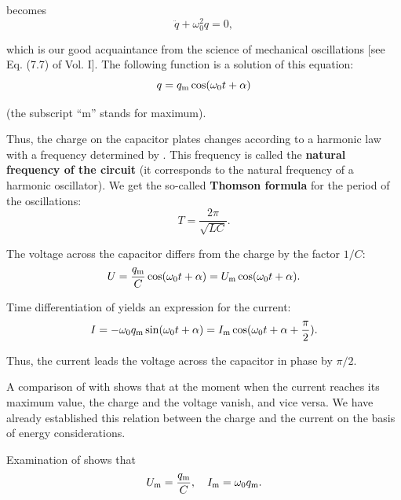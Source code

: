 \noindent
{} becomes
\begin{equation}\label{eq:13_4}
    \ddot{q} + \omega_0^2 q = 0,
\end{equation}

\noindent
which is our good acquaintance from the science of mechanical oscillations [see Eq. (7.7) of Vol. I].
The following function is a solution of this equation:
\begin{equation}\label{eq:13_5}
    q = q_{\text{m}} \cos(\omega_0 t + \alpha)
\end{equation}

\noindent
(the subscript ``m'' stands for maximum).

Thus, the charge on the capacitor plates changes according to a harmonic law with a frequency determined by .
This frequency is called the \textbf{natural frequency of the circuit} (it corresponds to the natural frequency of a harmonic oscillator).
We get the so-called \textbf{Thomson formula} for the period of the oscillations:
\begin{equation}\label{eq:13_6}
    T = \frac{2\pi}{\sqrt{LC}}.
\end{equation}

The voltage across the capacitor differs from the charge by the factor $1/C$:
\begin{equation}\label{eq:13_7}
    U = \frac{q_{\text{m}}}{C} \cos(\omega_0 t + \alpha) = U_{\text{m}} \cos(\omega_0 t + \alpha).
\end{equation}

Time differentiation of  yields an expression for the current:
\begin{equation}\label{eq:13_8}
    I = - \omega_0 q_{\text{m}} \sin(\omega_0 t + \alpha) = I_{\text{m}} \cos(\omega_0 t + \alpha + \frac{\pi}{2}).
\end{equation}

\noindent
Thus, the current leads the voltage across the capacitor in phase by $\pi/2$.

A comparison of  with  shows that at the moment when the current reaches its maximum value, the charge and the voltage vanish, and vice versa.
We have already established this relation between the charge and the current on the basis of energy considerations.

Examination of  shows that
\begin{equation*}
    U_{\text{m}} = \frac{q_{\text{m}}}{C}, \quad I_{\text{m}} = \omega_0 q_{\text{m}}.
\end{equation*}

